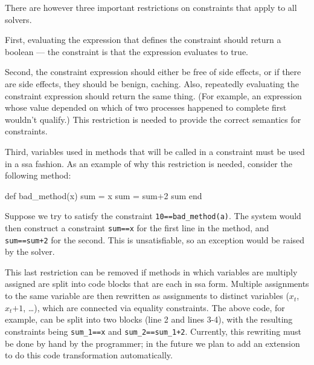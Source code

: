 
There are however three important restrictions on constraints that
apply to all solvers.

First, evaluating the expression that defines the constraint should return a
boolean --- the constraint is that the expression evaluates to true.

Second, the constraint expression should either be free of side
effects, or if there are side effects, they should be benign,
\eg caching.  Also, repeatedly evaluating the constraint expression
should return the same thing.  (For example, an expression whose value
depended on which of two processes happened to complete first wouldn't
qualify.)  This restriction is needed to provide the correct semantics
for constraints.

Third, variables used in methods that will be called in a constraint
must be used in a \ac{ssa} fashion.  As an example of why this
restriction is needed, consider the following method:
\begin{code}
def bad_method(x)
  sum = x
  sum = sum+2
  sum
end
\end{code}

Suppose we try to satisfy the constraint
\lstinline{10==bad_method(a)}. The system would then construct a
constraint \lstinline{sum==x} for the first line in the method, and
\lstinline{sum==sum+2} for the second. This is unsatisfiable, so an
exception would be raised by the solver.

This last restriction can be removed if methods in which variables are
multiply assigned are split into code blocks that are each
in \ac{ssa} form. Multiple assignments to the same variable are then
rewritten as assignments to distinct variables (\eg $x_t$, $x_t{+1}$,
\ldots), which are connected via equality constraints. The above
code, for example, can be split into two blocks (line 2 and lines
3-4), with the resulting constraints being  \lstinline{sum_1==x} and
\lstinline{sum_2==sum_1+2}.  Currently, this rewriting must be done by
hand by the programmer; in the future we plan to add an extension to
do this code transformation automatically.

